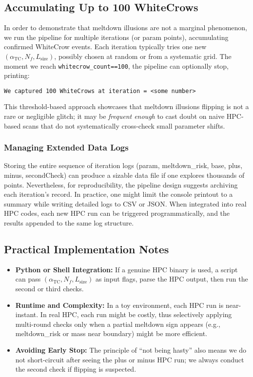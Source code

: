 \documentclass[11pt]{article}
\begin{document}
\subsection{Accumulating Up to 100 WhiteCrows}

In order to demonstrate that meltdown illusions are not a marginal phenomenon,
we run the pipeline for multiple iterations (or param points),
accumulating confirmed WhiteCrow events. Each iteration typically tries
one new $(\alpha_{\mathrm{TC}}, N_f, L_{\mathrm{size}})$, possibly chosen at random
or from a systematic grid. The moment we reach
\texttt{whitecrow\_count==100}, the pipeline can optionally stop, printing:

\begin{verbatim}
We captured 100 WhiteCrows at iteration = <some number>
\end{verbatim}

This threshold-based approach showcases
that meltdown illusions flipping is not a rare or negligible glitch;
it may be \textit{frequent enough} to cast doubt on naive HPC-based scans
that do not systematically cross-check small parameter shifts.

\subsubsection{Managing Extended Data Logs}

Storing the entire sequence of iteration logs (param, meltdown\_risk, base, plus, minus,
secondCheck) can produce a sizable data file if one explores thousands of points.
Nevertheless, for reproducibility, the pipeline design
suggests archiving each iteration's record. In practice, one might limit
the console printout to a summary while writing detailed logs to CSV or JSON.
When integrated into real HPC codes, each new HPC run can be triggered programmatically,
and the results appended to the same log structure.

\subsection{Practical Implementation Notes}

\begin{itemize}
\item \textbf{Python or Shell Integration:} 
      If a genuine HPC binary is used, a script can pass $(\alpha_{\mathrm{TC}},N_f,L_{\mathrm{size}})$
      as input flags, parse the HPC output, then run the second or third checks.
\item \textbf{Runtime and Complexity:} 
      In a toy environment, each HPC run is near-instant. 
      In real HPC, each run might be costly, 
      thus selectively applying multi-round checks only when a partial meltdown sign appears 
      (e.g., meltdown\_risk or mass near boundary) might be more efficient.
\item \textbf{Avoiding Early Stop:} 
      The principle of ``not being hasty'' also means we do not short-circuit
      after seeing the plus or minus HPC run; we always conduct the second check
      if flipping is suspected.
\end{itemize}
\end{document}
